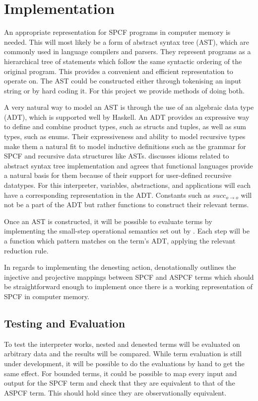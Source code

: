 \documentclass[12pt,a4paper]{report}
\theoremstyle{definition}
\theoremstyle{remark}
\begin{document}
\section{Implementation}\label{section: lit-review-impl}
An appropriate representation for SPCF programs in computer memory is needed. This will most likely be a form of abstract syntax tree (AST), which are commonly used in language compilers and parsers. They represent programs as a hierarchical tree of statements which follow the same syntactic ordering of the original program. This provides a convenient and efficient representation to operate on. The AST could be constructed either through tokenising an input string or by hard coding it. For this project we provide methods of doing both.

A very natural way to model an AST is through the use of an algebraic data type (ADT), which is supported well by Haskell. An ADT provides an expressive way to define and combine product types, such as structs and tuples, as well as sum types, such as enums. Their expressiveness and ability to model recursive types make them a natural fit to model inductive definitions such as the grammar for SPCF and recursive data structures like ASTs. \cite{jones_2003} discusses idioms related to abstract syntax tree implementation and agrees that functional languages provide a natural basis for them because of their support for user-defined recursive datatypes. For this interpreter, variables, abstractions, and applications will each have a corresponding representation in the ADT. Constants such as $succ_{o \rightarrow o}$ will not be a part of the ADT but rather functions to construct their relevant terms.

Once an AST is constructed, it will be possible to evaluate terms by implementing the small-step operational semantics set out by \cite{laird_2007}. Each step will be a function which pattern matches on the term's ADT, applying the relevant reduction rule.

In regards to implementing the denesting action, \cite{laird_2007} denotationally outlines the injective and projective mappings between SPCF and ASPCF terms which should be straightforward enough to implement once there is a working representation of SPCF in computer memory. 

\subsection{Testing and Evaluation}
To test the interpreter works, nested and denested terms will be evaluated on arbitrary data and the results will be compared. While term evaluation is still under development, it will be possible to do the evaluations by hand to get the same effect. For bounded terms, it could be possible to map every input and output for the SPCF term and check that they are equivalent to that of the ASPCF term. This should hold since they are observationally equivalent. 
\end{document}
